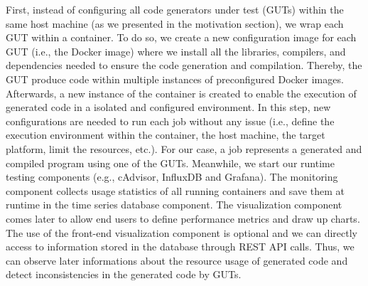 First, instead of configuring all code generators under test (GUTs) within the same host machine (as we presented in the motivation section), we wrap each GUT within a container. To do so, we create a new configuration image for each GUT (i.e., the Docker image) where we install all the libraries, compilers, and dependencies needed to ensure the code generation and compilation. Thereby, the GUT produce code within multiple instances of preconfigured Docker images. Afterwards, a new instance of the container is created to enable the execution of generated code in a isolated and configured environment. In this step, new configurations are needed to run each job without any issue (i.e., define the execution environment within the container, the host machine, the target platform, limit the resources, etc.). For our case, a job represents a generated and compiled program using one of the GUTs. Meanwhile, we start our runtime testing components (e.g., cAdvisor, InfluxDB and Grafana). The monitoring component collects usage statistics of all running containers and save them at runtime in the time series database component. The visualization component comes later to allow end users to define performance metrics and draw up charts. The use of the front-end visualization component is optional and we can directly access to information stored in the database through REST API calls. Thus, we can observe later informations about the resource usage of generated code and detect inconsistencies in the generated code by GUTs.





